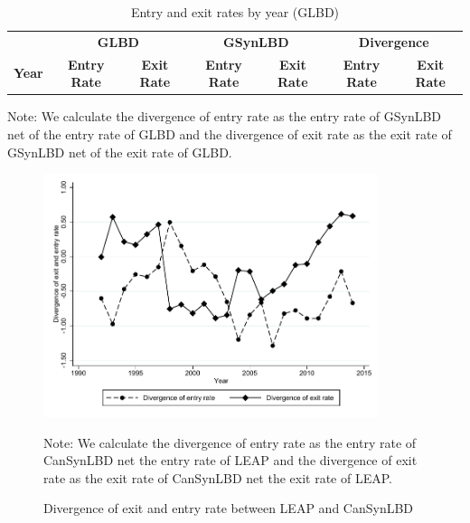 \begin{table}[H]
  \centering
\begin{threeparttable}
 \caption{Entry and exit rates by year (GLBD)} \label{tab:DE:FirmDynamics} \medskip
\renewcommand{\arraystretch}{1}
\begin{tabular}{l|c c| c c| c c}
\toprule
&\multicolumn{2}{c|}{\textbf{GLBD}} &  \multicolumn{2}{c|}{\textbf{GSynLBD}}&  \multicolumn{2}{c}{\textbf{Divergence}}\\
\textbf{Year}&\textbf{Entry Rate}&\textbf{Exit Rate}&\textbf{Entry Rate}&\textbf{Exit Rate} &\textbf{Entry Rate}&\textbf{Exit Rate}\\
\midrule

   \bottomrule
  \end{tabular} 
\begin{tablenotes}
\small
\item Note: We calculate the divergence of entry rate as the entry rate of GSynLBD net of the entry rate of GLBD and the divergence of exit rate as the exit rate of GSynLBD net of the exit rate of GLBD.
 \end{tablenotes}
 \end{threeparttable}
\end{table}
\begin{figure} [H]
\centering
\caption{Divergence of exit and entry rate between LEAP and CanSynLBD} \label{Divergence}
\includegraphics[height=2.8in, width=.7\linewidth]{graphs/Divergence_of_exit_and_entry_rate_between_LEAP_and_CanSynLBD_bw.pdf} 
\begin{minipage}{0.85\textwidth}
{\footnotesize Note: \CanTableNote  We calculate the divergence of entry rate as the entry rate of CanSynLBD net the entry rate of LEAP and the divergence of exit rate as the exit rate of CanSynLBD net the exit rate of LEAP. \par}
\end{minipage}
\end{figure}


